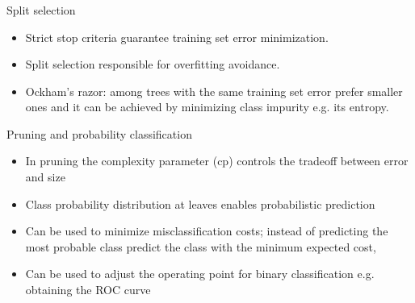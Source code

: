 \documentclass{beamer}
\begin{document}
\begin{frame}
\small
\frametitle{}
\begin{block}{Split selection}
\begin{itemize}
\item Strict stop criteria guarantee training set error minimization.
\item Split selection responsible for overfitting avoidance.
\item Ockham's razor: among trees with the same training set error prefer smaller ones and it can be achieved by minimizing class impurity e.g. its entropy.
\end{itemize}
\end{block}
\begin{block}{Pruning and probability classification}
\begin{itemize}
\item In pruning the complexity parameter (cp) controls the tradeoff between error and size
\item Class probability distribution at leaves enables probabilistic prediction
\item Can be used to minimize misclassification costs; instead of predicting the most probable class predict the class with the minimum expected cost,
\item Can be used to adjust the operating point for binary classification e.g. obtaining the ROC curve
\end{itemize}
\end{block}
\end{frame}

\end{document}
